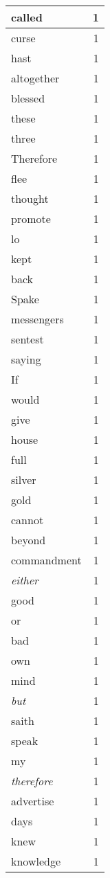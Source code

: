 \begin{center}
\begin{longtable}{l|r}
called & 1\\ \hline 
curse & 1\\ \hline 
hast & 1\\ \hline 
altogether & 1\\ \hline 
blessed & 1\\ \hline 
these & 1\\ \hline 
three & 1\\ \hline 
Therefore & 1\\ \hline 
flee & 1\\ \hline 
thought & 1\\ \hline 
promote & 1\\ \hline 
lo & 1\\ \hline 
kept & 1\\ \hline 
back & 1\\ \hline 
Spake & 1\\ \hline 
messengers & 1\\ \hline 
sentest & 1\\ \hline 
saying & 1\\ \hline 
If & 1\\ \hline 
would & 1\\ \hline 
give & 1\\ \hline 
house & 1\\ \hline 
full & 1\\ \hline 
silver & 1\\ \hline 
gold & 1\\ \hline 
cannot & 1\\ \hline 
beyond & 1\\ \hline 
commandment & 1\\ \hline 
\emph{either} & 1\\ \hline 
good & 1\\ \hline 
or & 1\\ \hline 
bad & 1\\ \hline 
own & 1\\ \hline 
mind & 1\\ \hline 
\emph{but} & 1\\ \hline 
saith & 1\\ \hline 
speak & 1\\ \hline 
my & 1\\ \hline 
\emph{therefore} & 1\\ \hline 
advertise & 1\\ \hline 
days & 1\\ \hline 
knew & 1\\ \hline 
knowledge & 1\\ \hline 

\end{longtable}
\end{center}
